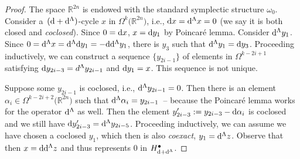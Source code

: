 \documentclass[pdftex]{sigma}
\numberwithin{equation}{section}
\begin{document}
\begin{proof}
The space $\mathbb{R}^{2n}$ is endowed with the standard symplectic structure $\omega_0$. Consider a~$({\rm d}+{\rm d}^{\Lambda})$-cycle $x$ in $\Omega^k\big(\mathbb{R}^{2n}\big)$, i.e., ${\rm d}x={\rm d}^{\Lambda}x=0$ (we say it is both closed and \emph{coclosed}). Since $0={\rm d}x$, $x={\rm d}y_1$ by Poincar\'e lemma. Consider ${\rm d}^{\Lambda}y_1$. Since $0={\rm d}^{\Lambda}x={\rm d}^{\Lambda} {\rm d} y_1=-{\rm d} {\rm d}^{\Lambda} y_1$, there is $y_3$ such that ${\rm d}^{\Lambda}y_1={\rm d}y_3$. Proceeding inductively, we can construct a sequence $\{y_{2i-1}\}$ of elements in $\Omega^{k-2i+1}$ satisfying ${\rm d}y_{2i-3}=d^{\Lambda}y_{2i-1}$ and ${\rm d}y_1=x$. This sequence is not unique.

Suppose some $y_{2i-1}$ is coclosed, i.e., ${\rm d}^{\Lambda}y_{2i-1}=0$. Then there is an element $\alpha_i\in \Omega^{k-2i+2}\big(\mathbb{R}^{2n}\big)$ such that ${\rm d}^{\Lambda}\alpha_i=y_{2i-1}$~-- because the Poincar\'e lemma works for the operator ${\rm d}^{\Lambda}$ as well. Then the element $y'_{2i-3}:=y_{2i-3}-{\rm d} \alpha_i$ is coclosed and we still have ${\rm d}y'_{2i-3}={\rm d}^{\Lambda}y_{2i-5}$. Proceeding inductively, we can assume we have chosen a coclosed $y_1$, which then is also \emph{coexact}, $y_1={\rm d}^{\Lambda}z$. Observe that then $x={\rm d}{\rm d}^{\Lambda}z$ and thus represents 0 in $H^{\bullet}_{{\rm d}+{\rm d}^{\Lambda}}$.


\end{proof}
\end{document}
